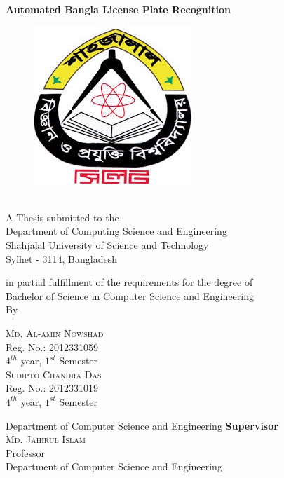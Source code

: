 \documentclass{standalone}
\begin{document}
\begin{titlepage}
\begin{center}
    \vspace{0.5cm}
    {\Large \bf Automated Bangla License Plate Recognition}
    \begin{figure}[h]
	\centering
	\includegraphics[scale=0.6]{./img/varsityLogo}
	\end{figure}\\
    
    \vspace{0.5cm}
	A Thesis submitted to the \\
    {\large Department of Computing Science and Engineering}\\
    {\Large Shahjalal University of Science and Technology}\\
    Sylhet - 3114, Bangladesh
	
	in partial fulfillment of the requirements for the degree of \\
        
    {\Large Bachelor of Science in Computer Science and Engineering}\\
    
    \vfill {\LARGE By}\\
    \begin{multicols}{2}
    \textsc{\Large Md. Al-amin Nowshad }\\
    Reg. No.: 2012331059\\ $4^{th}$ year, $1^{st}$ Semester\\
    \textsc{\Large Sudipto Chandra Das} \\
    Reg. No.: 2012331019\\ $4^{th}$ year, $1^{st}$ Semester\\ 
	\end{multicols}
	
    \vfill Department of Computer Science and Engineering
    \vfill
    {\bf Supervisor}\\
    \textsc{\Large Md. Jahirul Islam} \\
    Professor\\ 
	Department of Computer Science and Engineering\\
    

\end{center}
\end{titlepage}
\end{document}

